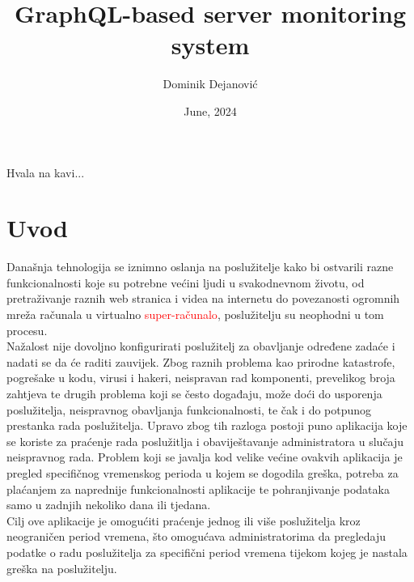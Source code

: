 \documentclass[zavrsnirad]{fer}
\title{GraphQL-based server monitoring system}
\author{Dominik Dejanović}
\date{June, 2024}
\begin{document}
\maketitle






\begin{zahvale}
  Hvala na kavi...
\end{zahvale}


\mainmatter


\tableofcontents


\chapter{Uvod}
\label{pog:uvod}
Današnja tehnologija se iznimno oslanja na poslužitelje kako bi ostvarili razne funkcionalnosti koje su potrebne većini ljudi u svakodnevnom životu, od pretraživanje raznih web stranica i videa na internetu do povezanosti ogromnih mreža računala u virtualno \textcolor{red}{super-računalo}, poslužitelju su neophodni u tom procesu. 
\\Nažalost nije dovoljno konfigurirati poslužitelj za obavljanje određene zadaće i nadati se da će raditi zauvijek. Zbog raznih problema kao prirodne katastrofe, pogrešake u kodu, virusi i hakeri, neispravan rad komponenti, prevelikog broja zahtjeva te drugih problema koji se često događaju, može doći do usporenja poslužitelja, neispravnog obavljanja funkcionalnosti, te čak i do potpunog prestanka rada poslužitelja. Upravo zbog tih razloga postoji puno aplikacija koje se koriste za praćenje rada poslužitlja i obaviještavanje administratora u slučaju neispravnog rada. Problem koji se javalja kod velike većine ovakvih aplikacija je pregled specifičnog vremenskog perioda u kojem se dogodila greška, potreba za plaćanjem za naprednije funkcionalnosti aplikacije te pohranjivanje podataka samo u zadnjih nekoliko dana ili tjedana.
\\Cilj ove aplikacije je omogućiti praćenje jednog ili više poslužitelja kroz neograničen period vremena, što omogućava administratorima da pregledaju podatke o radu poslužitelja za specifični period vremena tijekom kojeg je nastala greška na poslužitelju.
\end{document}
